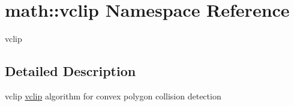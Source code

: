 \hypertarget{namespacemath_1_1vclip}{
\section{math::vclip Namespace Reference}
\label{namespacemath_1_1vclip}
}


vclip  


\subsection{Detailed Description}
vclip \hyperlink{namespacemath_1_1vclip}{vclip} algorithm for convex polygon collision detection 